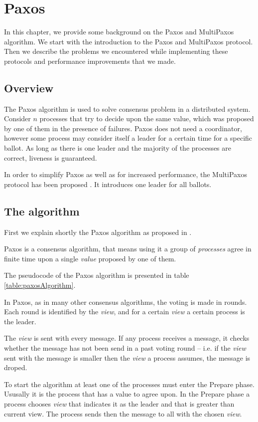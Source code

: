 \chapter{Paxos}

In this chapter, we provide some background on the Paxos and MultiPaxos algorithm. We start with the introduction to the Paxos and MultiPaxos protocol. Then we describe the problems we encountered while implementing these protocols and performance improvements that we made.

\section{Overview}
The Paxos algorithm is used to solve consensus problem in a distributed system. Consider $n$ processes that try to decide upon the same value, which was proposed by one of them in the presence of failures. Paxos does not need a coordinator, however some process may consider itself a leader for a certain time for a specific ballot. As long as there is one leader and the majority of the processes are correct, liveness is guaranteed.

In order to simplify Paxos as well as for increased performance, the MultiPaxos protocol has been proposed \cite{Lam01}. It introduces one leader for all ballots.

\section{The algorithm}
First we explain shortly the Paxos algorithm as proposed in \cite{Lam98}.

Paxos is a consensus algorithm, that means using it a group of \textit{processes} agree in finite time upon a single \textit{value} proposed by one of them.

The pseudocode of the Paxos algorithm is presented in table \ref{table:paxosAlgorithm}.

In Paxos, as in many other consensus algorithms, the voting is made in rounds. Each round is identified by the \textit{view}, and for a certain \textit{view} a certain process is the leader.

The \textit{view} is sent with every message. If any process receives a message, it checks whether the message has not been send in a past voting round -- i.e. if the \textit{view} sent with the message is smaller then the \textit{view} a process assumes, the message is droped.

To start the algorithm at least one of the processes must enter the Prepare phase. Ususally it is the process that has a value to agree upon.
In the Prepare phase a process chooses \textit{view} that indicates it as the leader and that is greater than current view. The process sends then the \prepare message to all with the chosen \textit{view}.

